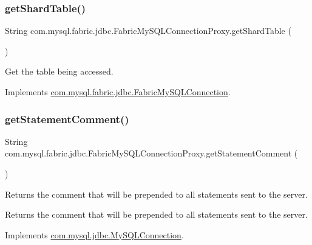\subsubsection{\texorpdfstring{get\+Shard\+Table()}{getShardTable()}}
{\footnotesize\ttfamily String com.\+mysql.\+fabric.\+jdbc.\+Fabric\+My\+S\+Q\+L\+Connection\+Proxy.\+get\+Shard\+Table (\begin{DoxyParamCaption}{ }\end{DoxyParamCaption})}

Get the table being accessed. 

Implements \mbox{\hyperlink{interfacecom_1_1mysql_1_1fabric_1_1jdbc_1_1_fabric_my_s_q_l_connection_ae6b5717b5aac5a32d46b5fce83de74d7}{com.\+mysql.\+fabric.\+jdbc.\+Fabric\+My\+S\+Q\+L\+Connection}}.

\mbox{\label{classcom_1_1mysql_1_1fabric_1_1jdbc_1_1_fabric_my_s_q_l_connection_proxy_aac900a94d9228e2b4f0c50cacee5feeb}} 
\subsubsection{\texorpdfstring{get\+Statement\+Comment()}{getStatementComment()}}
{\footnotesize\ttfamily String com.\+mysql.\+fabric.\+jdbc.\+Fabric\+My\+S\+Q\+L\+Connection\+Proxy.\+get\+Statement\+Comment (\begin{DoxyParamCaption}{ }\end{DoxyParamCaption})}

Returns the comment that will be prepended to all statements sent to the server.

\begin{DoxyReturn}{Returns}
the comment that will be prepended to all statements sent to the server. 
\end{DoxyReturn}


Implements \mbox{\hyperlink{interfacecom_1_1mysql_1_1jdbc_1_1_my_s_q_l_connection_aca7bbebb7ec6fa745218e6dca38cfaad}{com.\+mysql.\+jdbc.\+My\+S\+Q\+L\+Connection}}.


